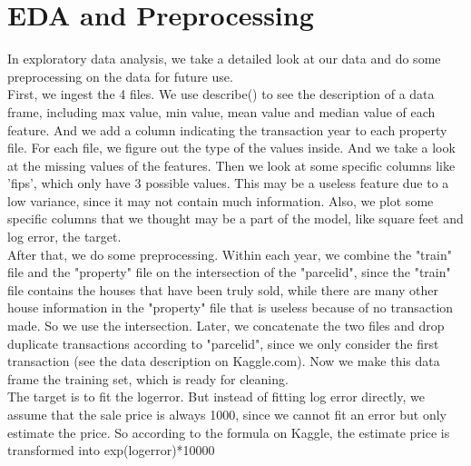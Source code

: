 \documentclass[conference]{IEEEtran}
\begin{document}
\section{EDA and Preprocessing}\label{ii}
\indent In exploratory data analysis, we take a detailed look at our data and do some preprocessing on the data for future use. \\
\indent First, we ingest the 4 files. We use describe() to see the description of a data frame, including max value, min value, mean value and median value of each feature. And we add a column indicating the transaction year to each property file. For each file, we figure out the type of the values inside. And we take a look at the missing values of the features. Then we look at some specific columns like 'fips', which only have 3 possible values. This may be a useless feature due to a low variance, since it may not contain much information. Also, we plot some specific columns that we thought may be a part of the model, like square feet and log error, the target. \\
\indent After that, we do some preprocessing. Within each year, we combine the "train" file and the "property" file on the intersection of the "parcelid", since the "train" file contains the houses that have been truly sold, while there are many other house information in the "property" file that is useless because of no transaction made. So we use the intersection. Later, we concatenate the two files and drop duplicate transactions according to "parcelid", since we only consider the first transaction (see the data description on Kaggle.com). Now we make this data frame the training set, which is ready for cleaning. \\
\indent The target is to fit the logerror. But instead of fitting log error directly, we assume that the sale price is always 1000, since we cannot fit an error but only estimate the price. So according to the formula on Kaggle, the estimate price is transformed into exp(logerror)*10000
%
\end{document}
